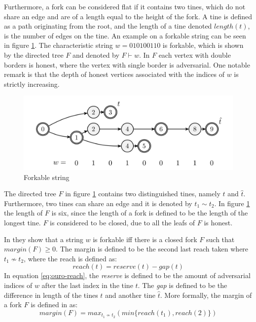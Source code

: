 Furthermore, a fork can be considered flat if it contains two tines, which do not share an edge and are of a length equal to the height of the fork. A tine is defined as a path originating from the root, and the length of a tine denoted $length(t)$, is the number of edges on the tine.
An example on a forkable string can be seen in figure \ref{fig:forkable_string}. The characteristic string $w = 010100110$ is forkable, which is shown by the directed tree $F$ and denoted by $F \vdash w$. In $F$ each vertex with double borders is honest, where the vertex with single border is adversarial. One notable remark is that the depth of honest vertices associated with the indices of $w$ is strictly increasing. 

\begin{figure}
    \centering
    \includegraphics[width=\linewidth]{images/ouro-forkable-string.png}
    \caption{Forkable string}
    \label{fig:forkable_string}
\end{figure}

The directed tree $F$ in figure \ref{fig:forkable_string} contains two distinguished tines, namely $t$ and $\hat{t}$. Furthermore, two tines can share an edge and it is denoted by $t_1 \sim t_2$. In figure \ref{fig:forkable_string} the length of $F$ is six, since the length of a fork is defined to be the length of the longest tine. $F$ is considered to be closed, due to all the leafs of $F$ is honest. 

In \cite{ouroboros} they show that a string $w$ is forkable iff there is a closed fork $F$ such that $margin(F) \geq 0$. The margin is defined to be the second last reach taken where $t_1 \not\sim t_2$, where the reach is defined as:
\begin{equation}
\label{eq:ouro-reach}
    reach(t) = reserve(t) - gap(t)
\end{equation}
In equation \ref{eq:ouro-reach}, the \emph{reserve} is defined to be the amount of adversarial indices of $w$ after the last index in the tine $t$. The \emph{gap} is defined to be the difference in length of the tines $t$ and another tine $\hat{t}$. More formally, the margin of a fork $F$ is defined in \cite{ouroboros} as:
\begin{equation}
    margin(F) = max_{t_1 \not\sim t_2}(min\{reach(t_1),reach(2)\})
\end{equation}


